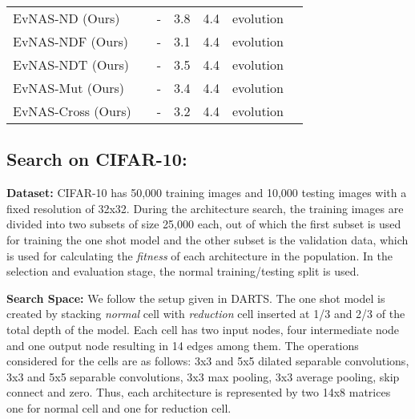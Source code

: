 \documentclass[final]{cvpr}
\begin{document}
\begin{table*}[t]
\begin{tabular}{lcccccc}
    EvNAS-ND (Ours)                   &  & - & 3.8 & 4.4 & evolution\\
    EvNAS-NDF (Ours)                   &  & - & 3.1 & 4.4 & evolution\\
    EvNAS-NDT (Ours)                   &  & - & 3.5 & 4.4 & evolution\\
    EvNAS-Mut (Ours)                   &  & - & 3.4 & 4.4 & evolution\\
    EvNAS-Cross (Ours)                   &  & - & 3.2 & 4.4 & evolution\\
    
    \end{tabular}
\end{table*}

\subsection{Search on CIFAR-10:} \label{res:cifar10}
\textbf{Dataset:} CIFAR-10 \cite{krizhevsky2009learning} has 50,000 training
images and 10,000 testing images with a fixed resolution of 32x32. During
the architecture search, the training images are divided into two subsets of size
25,000 each, out of which the first subset is used for training the one shot model
and the other subset is the validation data, which is used for calculating the \textit{fitness}
of each architecture in the population. In the selection and evaluation stage, the normal
training/testing split is used.

\textbf{Search Space:} We follow the setup given in DARTS\cite{liu2018darts2}. The one shot model is
created by stacking \textit{normal} cell with \textit{reduction} cell inserted at 1/3 and 2/3 of the
total depth of the model. Each cell has two input nodes, four intermediate node and one output
node resulting in 14 edges among them. The operations considered for the cells are as follows: 
3x3 and 5x5 dilated separable convolutions, 3x3 and 5x5 separable convolutions, 3x3 max pooling, 
3x3 average pooling, skip connect and zero. Thus, each architecture is represented by two
14x8 matrices one for normal cell and one for reduction cell.
\end{document}
